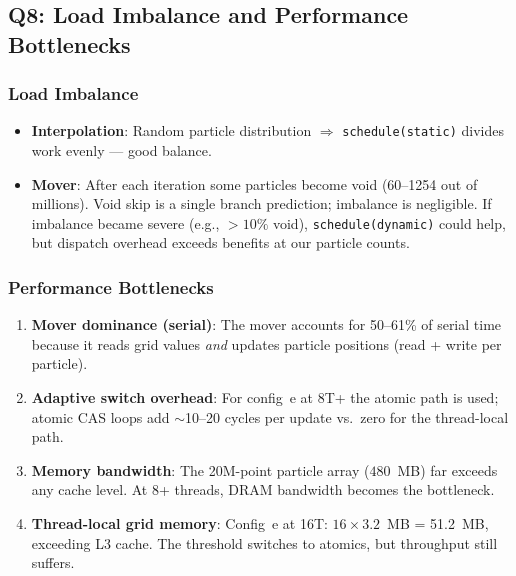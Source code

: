 \documentclass[12pt,a4paper]{article}
\begin{document}
\subsection{Q8: Load Imbalance and Performance Bottlenecks}

\subsubsection{Load Imbalance}

\begin{itemize}
    \item \textbf{Interpolation}: Random particle distribution $\Rightarrow$
          \texttt{schedule(static)} divides work evenly --- good balance.
    \item \textbf{Mover}: After each iteration some particles become void (60--1254 out
          of millions). Void skip is a single branch prediction; imbalance is negligible.
          If imbalance became severe (e.g., $>10\%$ void), \texttt{schedule(dynamic)}
          could help, but dispatch overhead exceeds benefits at our particle counts.
\end{itemize}

\subsubsection{Performance Bottlenecks}

\begin{enumerate}
    \item \textbf{Mover dominance (serial)}: The mover accounts for 50--61\% of serial
          time because it reads grid values \textit{and} updates particle positions
          (read + write per particle).
    \item \textbf{Adaptive switch overhead}: For config~e at 8T+ the atomic path is
          used; atomic CAS loops add $\sim$10--20 cycles per update vs.\ zero for the
          thread-local path.
    \item \textbf{Memory bandwidth}: The 20M-point particle array ($480$~MB) far exceeds
          any cache level. At 8+ threads, DRAM bandwidth becomes the bottleneck.
    \item \textbf{Thread-local grid memory}: Config~e at 16T: $16\times3.2$~MB = 51.2~MB,
          exceeding L3 cache. The threshold switches to atomics, but throughput still
          suffers.
\end{enumerate}
\end{document}
